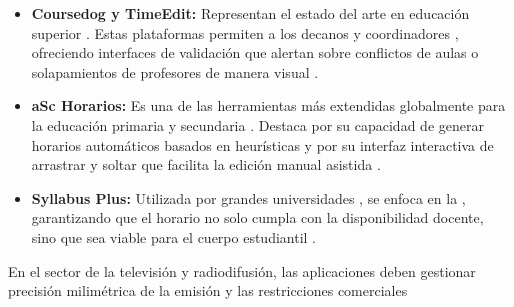 \documentclass{article}
\begin{document}
\begin{itemize}
    \item \textbf{Coursedog y TimeEdit:} Representan el estado del arte en educación superior \agregaesto{[REF]}. Estas plataformas  permiten a los decanos y coordinadores , ofreciendo interfaces de validación que alertan sobre conflictos de aulas o solapamientos de profesores de manera visual \cite{bass2021}.
  
  
    \item \textbf{aSc Horarios:} Es una de las herramientas más extendidas globalmente para la educación primaria y secundaria \agregaesto{[REF]}. Destaca por su capacidad de generar horarios automáticos basados en heurísticas y por su interfaz interactiva de arrastrar y soltar que facilita la edición manual asistida \cite{pillay2016}.

  
    \item \textbf{Syllabus Plus:} Utilizada por grandes universidades ,  se enfoca en la , garantizando que el horario no solo cumpla con la disponibilidad docente, sino que sea viable para el cuerpo estudiantil \agregaesto{[REF]}.

   
\end{itemize}

En el sector de la televisión y radiodifusión, las aplicaciones deben gestionar  precisión milimétrica de la emisión y las restricciones comerciales \quitaesto{:} 
\end{document}
